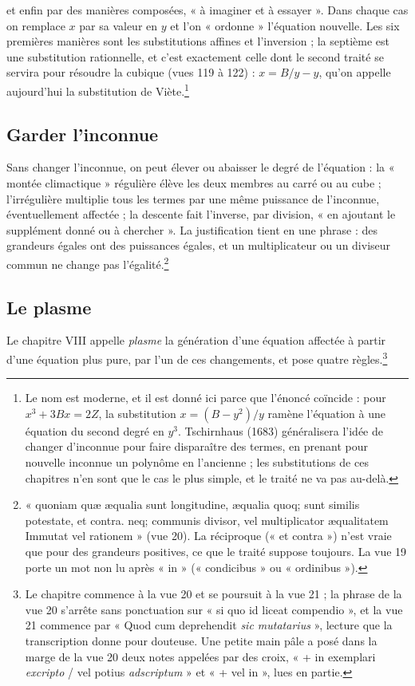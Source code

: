 \documentclass[11pt,a4paper]{article}
\begin{document}
et enfin par des manières composées, « à imaginer et à essayer ».
Dans chaque cas on remplace $x$ par sa valeur en $y$ et l'on « ordonne »
l'équation nouvelle. Les six premières manières sont les substitutions affines
et l'inversion ; la septième est une substitution rationnelle, et c'est
exactement celle dont le second traité se servira pour résoudre la cubique
(vues 119 à 122) : $x = B/y - y$, qu'on appelle aujourd'hui la substitution de
Viète.\footnote{Le nom est moderne, et il est donné ici parce que l'énoncé
coïncide : pour $x^3 + 3Bx = 2Z$, la substitution $x = (B - y^2)/y$ ramène
l'équation à une équation du second degré en $y^3$. Tschirnhaus (1683)
généralisera l'idée de changer d'inconnue pour faire disparaître des termes, en
prenant pour nouvelle inconnue un polynôme en l'ancienne ; les substitutions de
ces chapitres n'en sont que le cas le plus simple, et le traité ne va pas
au-delà.}

\subsection*{Garder l'inconnue}

Sans changer l'inconnue, on peut élever ou abaisser le degré de l'équation : la
« montée climactique » régulière élève les deux membres au carré ou au cube ;
l'irrégulière multiplie tous les termes par une même puissance de l'inconnue,
éventuellement affectée ; la descente fait l'inverse, par division, « en
ajoutant le supplément donné ou à chercher ». La justification tient en une
phrase : des grandeurs égales ont des puissances égales, et un multiplicateur
ou un diviseur commun ne change pas l'égalité.\footnote{« quoniam quæ æqualia
sunt longitudine, æqualia quoq; sunt similis potestate, et contra. neq;
communis divisor, vel multiplicator æqualitatem Immutat vel rationem »
(vue 20). La réciproque (« et contra ») n'est vraie que pour des grandeurs
positives, ce que le traité suppose toujours. La vue 19 porte un mot non lu
après « in » (« condicibus » ou « ordinibus »).}

\subsection*{Le plasme}

Le chapitre VIII appelle \emph{plasme} la génération d'une équation affectée à
partir d'une équation plus pure, par l'un de ces changements, et pose quatre
règles.\footnote{Le chapitre commence à la vue 20 et se poursuit à la vue 21 ;
la phrase de la vue 20 s'arrête sans ponctuation sur « si quo id liceat
compendio », et la vue 21 commence par « Quod cum deprehendit \emph{sic
mutatarius} », lecture que la transcription donne pour douteuse. Une petite main
pâle a posé dans la marge de la vue 20 deux notes appelées par des croix,
« + in exemplari \emph{excripto} / vel potius \emph{adscriptum} » et « + vel
in », lues en partie.}
\end{document}
